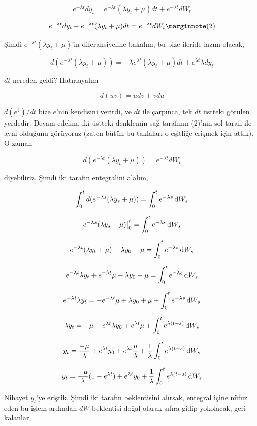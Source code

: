 \documentclass[12pt,fleqn]{article}\usepackage{../../common}
\begin{document}
$$ e^{-\lambda t}dy_t = e^{-\lambda t}(\lambda y_t + \mu)dt + e^{-\lambda t} dW_t  $$

$$ e^{-\lambda t}dy_t - e^{-\lambda t}(\lambda y_t + \mu)dt =  e^{-\lambda t} dW_t 
\mlabel{2}
$$

Şimdi $e^{-\lambda t}(\lambda y_t + \mu)$'in diferansiyeline bakalım, bu
bize ileride lazım olacak,

$$ d(e^{-\lambda t}(\lambda y_t + \mu)) = 
-\lambda e^{\lambda t} (\lambda y_t + \mu) dt + e^{\lambda t} \lambda dy_t 
$$

$dt$ nereden geldi? Hatırlayalım 

$$ d(uv) = u dv + v du $$

$d(e^{?})/dt$ bize $e$'nin kendisini verirdi, ve $dt$ ile çarpınca, tek $dt$
üstteki görülen yerdedir. Devam edelim, iki üstteki denklemin sağ tarafının
(2)'nin sol tarafı ile aynı olduğunu görüyoruz (zaten bütün bu taklaları o
eşitliğe erişmek için attık). O zaman

$$ d(e^{-\lambda t}(\lambda y_t + \mu)) =  e^{-\lambda t} dW_t  $$

diyebiliriz. Şimdi iki tarafın entegralini alalım,

$$
\int_{0}^{t} d(e^{-\lambda s}(\lambda y_s + \mu)) =
\int_{0}^{t} e^{-\lambda s} \,\mathrm{d} W_s
$$

$$
e^{-\lambda s}(\lambda y_s + \mu) \big|_{0}^{t} =
\int_{0}^{t} e^{-\lambda s} \,\mathrm{d} W_s
$$

$$
e^{-\lambda t}(\lambda y_t + \mu) - \lambda y_0 - \mu =
\int_{0}^{t} e^{-\lambda s} \,\mathrm{d} W_s
$$

$$
e^{-\lambda t}\lambda y_t + e^{-\lambda t}\mu - \lambda y_0 - \mu =
\int_{0}^{t} e^{-\lambda s} \,\mathrm{d} W_s
$$

$$ 
e^{-\lambda t}\lambda y_t  =
- e^{-\lambda t}\mu + \lambda y_0 + \mu + \int_{0}^{t} e^{-\lambda s} \,\mathrm{d} W_s 
$$

$$ 
\lambda y_t   =
- \mu + e^{\lambda t} \lambda y_0 + e^{\lambda t}\mu + \int_{0}^{t} e^{\lambda (t-s)} \,\mathrm{d} W_s 
$$

$$ 
y_t   = \frac{-\mu}{\lambda} + e^{\lambda t} y_0 + e^{\lambda t}\frac{\mu}{\lambda} + 
\frac{1}{\lambda}\int_{0}^{t} e^{\lambda (t-s)} \,\mathrm{d} W_s 
$$

$$ 
y_t = \frac{-\mu}{\lambda} ( 1 - e^{\lambda t}) + e^{\lambda t} y_0 + 
\frac{1}{\lambda}\int_{0}^{t} e^{\lambda (t-s)} \,\mathrm{d} W_s 
$$

Nihayet $y_t$'ye eriştik. Şimdi iki tarafın beklentisini alırsak, entegral
içine nüfuz eden bu işlem ardından $dW$ beklentisi doğal olarak sıfıra
gidip yokolacak, geri kalanlar,
\end{document}
